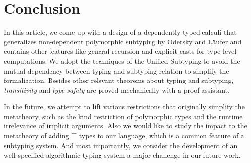 \section{Conclusion}

In this article, we come up with a design of a dependently-typed calculi \name
that generalizes non-dependent polymorphic subtyping by Odersky and
L\"aufer\cite{odersky1996putting} and contains other features like general
recursion and explicit casts for type-level computations.
We adopt the techniques of the Unified Subtyping\cite{yang2017unifying} to
avoid the mutual dependency between typing and subtyping relation to simplify
the formalization. Besides other relevant theorems about typing and subtyping,
\emph{transitivity} and \emph{type safety} are proved mechanically with a proof assistant.

In the future, we attempt to lift various restrictions that originally simplify
the metatheory, such as the kind restriction of polymorphic
types and the runtime irrelevance of implicit arguments. Also we would like to
study the impact to the metatheory of adding $\top$ types to our language,
which is a common feature of a subtyping system.
And most importantly, we consider the development
of an well-specified algorithmic typing system a major challenge in our future
work.